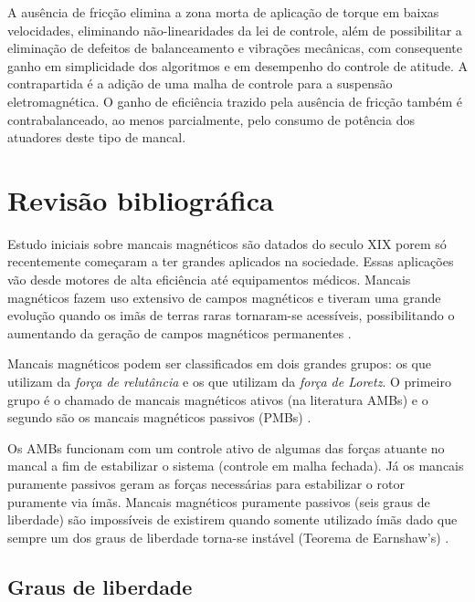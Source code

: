 A ausência de fricção elimina a zona morta de aplicação de torque em baixas velocidades, eliminando não-linearidades da lei de controle, além de possibilitar a eliminação de defeitos de balanceamento e vibrações mecânicas, com consequente ganho em simplicidade dos algoritmos e em desempenho do controle de atitude. A contrapartida é a adição de uma malha de controle para a suspensão eletromagnética. O ganho de eficiência trazido pela ausência de fricção também é contrabalanceado, ao menos parcialmente, pelo consumo de potência dos atuadores deste tipo de mancal.

\section{Revisão bibliográfica}


Estudo iniciais sobre mancais magnéticos são datados do seculo XIX \citep{Weise1989} porem só recentemente começaram a ter grandes aplicados na sociedade. Essas aplicações vão desde motores de alta eficiência até equipamentos médicos. Mancais magnéticos fazem uso extensivo de campos magnéticos e tiveram uma grande evolução quando os imãs de terras raras tornaram-se acessíveis, possibilitando o aumentando da geração de campos magnéticos permanentes \cite{Furlani2001}.

Mancais magnéticos podem ser classificados em dois grandes grupos: os que utilizam da \textit{força de relutância} e os que utilizam da \textit{força de Loretz}. O primeiro grupo é o chamado de mancais magnéticos ativos (na literatura AMBs) e o segundo são os mancais magnéticos passivos (PMBs) \cite{Schweitzer2009}.

Os AMBs funcionam com um controle ativo de algumas das forças atuante no mancal a fim de estabilizar o sistema (controle em malha fechada). Já os mancais puramente passivos geram as forças necessárias para estabilizar o rotor puramente via ímãs.
Mancais magnéticos puramente passivos (seis graus de liberdade) são impossíveis de existirem quando somente utilizado ímãs dado que sempre um dos graus de liberdade torna-se instável (Teorema de Earnshaw's) .




\subsection{Graus de liberdade}


